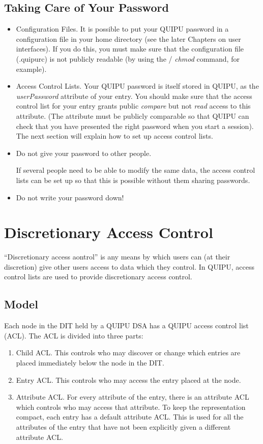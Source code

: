 \subsection{Taking Care of Your Password}

\begin{itemize}
\item
Configuration Files.
It is possible to put your QUIPU password in a configuration file in your
home directory (see the later Chapters on user interfaces).
If you do this, you must make sure that the configuration file (.quipurc)
is not publicly readable (by using the \unix/ {\em chmod} command, for
example).
\item
Access Control Lists.
Your QUIPU password is itself stored in QUIPU, as the {\em userPassword}
attribute of your entry. You should make sure that the access control list
for your entry grants public {\em compare} but not {\em read} access to
this attribute. (The attribute must be publicly comparable so that QUIPU
can check that you have presented the right password when you start a session).
The next section will explain how to set up access control lists.
\item
Do not give your password to other people.

If several people need to be able
to modify the same data, the access control lists can be set up so that this
is possible without them sharing passwords.
\item
Do not write your password down!
\end{itemize}

\section{Discretionary Access Control}
\label{disc_acl}

``Discretionary access aontrol'' is any means by which users can (at their
discretion) give other users access to data which they control. In QUIPU,
access control lists are used to provide discretionary access control.

\subsection{Model}

Each node in the DIT held by a QUIPU DSA has a QUIPU access control list (ACL).
The ACL is divided into three parts:

\begin{enumerate}
\item
Child ACL.
This controls who may discover or change which entries are placed immediately
below the node in the DIT.
\item
Entry ACL.
This controls who may access the entry placed at the node.
\item
Attribute ACL.
For every attribute of the entry, there is an attribute ACL which controls who 
may access that attribute. To keep the representation compact, each entry has
a default attribute ACL. This is used for all the attributes of the entry that
have not been explicitly given a different attribute ACL.
\end{enumerate}


